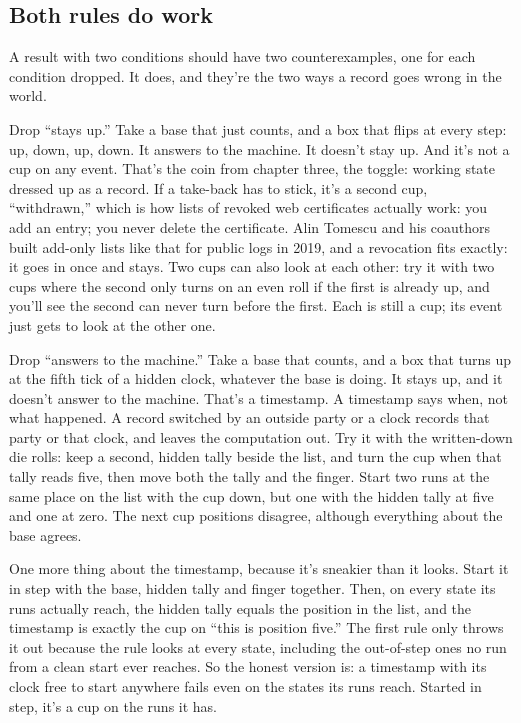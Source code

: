 \documentclass[11pt,twoside]{article}
\theoremstyle{thielethm}
\theoremstyle{thieledef}
\theoremstyle{thieledef}
\theoremstyle{thieledef}
\theoremstyle{thielethm}
\theoremstyle{thieleobs}
\theoremstyle{thielethm}
\begin{document}
\subsection{Both rules do work}

A result with two conditions should have two counterexamples, one for each condition dropped. It does, and they're the two ways a record goes wrong in the world.

Drop ``stays up.'' Take a base that just counts, and a box that flips at every step: up, down, up, down. It answers to the machine. It doesn't stay up. And it's not a cup on any event. That's the coin from chapter three, the toggle: working state dressed up as a record. If a take-back has to stick, it's a second cup, ``withdrawn,'' which is how lists of revoked web certificates actually work: you add an entry; you never delete the certificate. Alin Tomescu and his coauthors built add-only lists like that for public logs in 2019, and a revocation fits exactly: it goes in once and stays. Two cups can also look at each other: try it with two cups where the second only turns on an even roll if the first is already up, and you'll see the second can never turn before the first. Each is still a cup; its event just gets to look at the other one.

Drop ``answers to the machine.'' Take a base that counts, and a box that turns up at the fifth tick of a hidden clock, whatever the base is doing. It stays up, and it doesn't answer to the machine. That's a timestamp. A timestamp says when, not what happened. A record switched by an outside party or a clock records that party or that clock, and leaves the computation out. Try it with the written-down die rolls: keep a second, hidden tally beside the list, and turn the cup when that tally reads five, then move both the tally and the finger. Start two runs at the same place on the list with the cup down, but one with the hidden tally at five and one at zero. The next cup positions disagree, although everything about the base agrees.

One more thing about the timestamp, because it's sneakier than it looks. Start it in step with the base, hidden tally and finger together. Then, on every state its runs actually reach, the hidden tally equals the position in the list, and the timestamp is exactly the cup on ``this is position five.'' The first rule only throws it out because the rule looks at every state, including the out-of-step ones no run from a clean start ever reaches. So the honest version is: a timestamp with its clock free to start anywhere fails even on the states its runs reach. Started in step, it's a cup on the runs it has.
\end{document}
